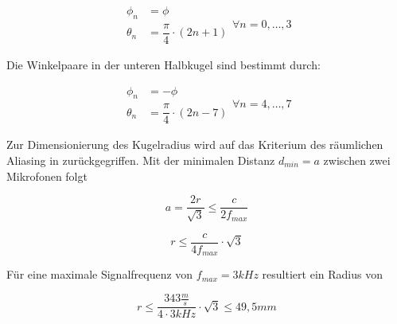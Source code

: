 \begin{equation}
    \begin{array}{lll}
        \phi_n & = \phi \\
        \theta_n & = \dfrac{\pi}{4}\cdot(2n+1)
    \end{array}
    \forall n=0,\dots, 3
\end{equation}

Die Winkelpaare in der unteren Halbkugel sind bestimmt durch:

\begin{equation}
    \begin{array}{lll}
        \phi_n & = -\phi \\
        \theta_n & = \dfrac{\pi}{4}\cdot(2n-7)
    \end{array}
     \forall n=4,\dots, 7
\end{equation}




Zur Dimensionierung des Kugelradius wird auf das Kriterium des räumlichen Aliasing in  zurückgegriffen. Mit der minimalen Distanz $d_{min} = a$ zwischen zwei Mikrofonen folgt

\begin{equation}
   a = \frac{2r}{\sqrt{3}} \leq \frac{c}{2f_{max}}
\end{equation}

\begin{equation}
   r \leq \frac{c}{4 f_{max}} \cdot \sqrt{3}
\end{equation}

Für eine maximale Signalfrequenz von $f_{max} = 3kHz$ resultiert ein Radius von

\begin{equation}
    r \leq \frac{343 \frac m s}{4 \cdot 3kHz} \cdot \sqrt{3} \leq 49,5 mm 
\end{equation}



